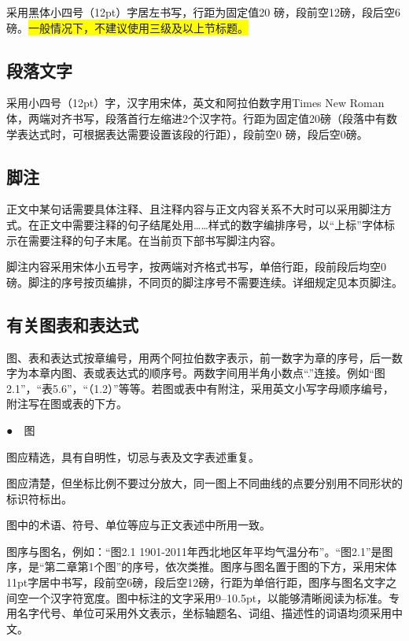 采用黑体小四号（12pt）字居左书写，行距为固定值20 磅，段前空12磅，段后空6磅。\colorbox {yellow}{一般情况下，不建议使用三级及以上节标题。}

\subsection{段落文字}
采用小四号（12pt）字，汉字用宋体，英文和阿拉伯数字用Times New Roman体，两端对齐书写，段落首行左缩进2个汉字符。行距为固定值20磅（段落中有数学表达式时，可根据表达需要设置该段的行距），段前空0 磅，段后空0磅。

\subsection{脚注}
正文中某句话需要具体注释、且注释内容与正文内容关系不大时可以采用脚注方式。在正文中需要注释的句子结尾处用……样式的数字编排序号，以“上标”字体标示在需要注释的句子末尾。在当前页下部书写脚注内容。

脚注内容采用宋体小五号字，按两端对齐格式书写，单倍行距，段前段后均空0磅。脚注的序号按页编排，不同页的脚注序号不需要连续。详细规定见本页脚注。

\subsection{有关图表和表达式}
图、表和表达式按章编号，用两个阿拉伯数字表示，前一数字为章的序号，后一数字为本章内图、表或表达式的顺序号。两数字间用半角小数点“.”连接。例如“图2.1”，“表5.6”，“（1.2）”等等。若图或表中有附注，采用英文小写字母顺序编号，附注写在图或表的下方。

●　图

图应精选，具有自明性，切忌与表及文字表述重复。

图应清楚，但坐标比例不要过分放大，同一图上不同曲线的点要分别用不同形状的标识符标出。

图中的术语、符号、单位等应与正文表述中所用一致。

图序与图名，例如：“图2.1  1901-2011年西北地区年平均气温分布”。“图2.1”是图序，是“第二章第1个图”的序号，依次类推。图序与图名置于图的下方，采用宋体11pt字居中书写，段前空6磅，段后空12磅，行距为单倍行距，图序与图名文字之间空一个汉字符宽度。图中标注的文字采用9--10.5pt，以能够清晰阅读为标准。专用名字代号、单位可采用外文表示，坐标轴题名、词组、描述性的词语均须采用中文。

